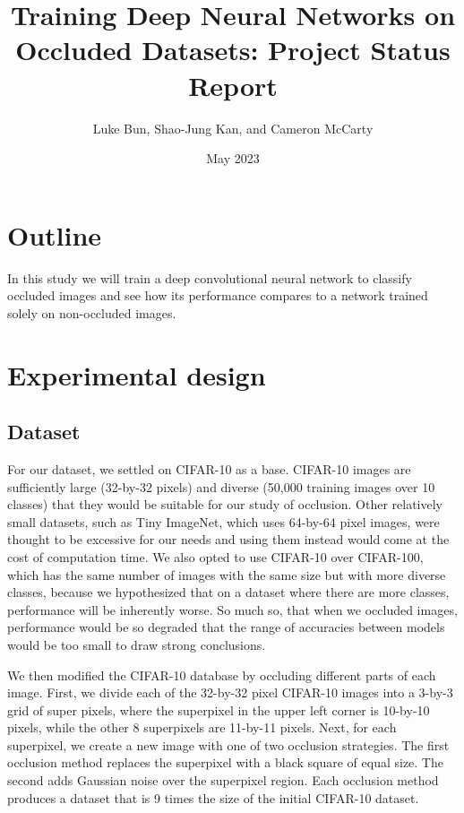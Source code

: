 \documentclass{article}
\title{Training Deep Neural Networks on Occluded Datasets: Project Status Report}
\author{Luke Bun, Shao-Jung Kan, and Cameron McCarty}
\date{May 2023}
\begin{document}
\maketitle

\section{Outline}
In this study we will train a deep convolutional neural network to classify occluded images and see how its performance compares to a network trained solely on non-occluded images. 

\section{Experimental design}
\subsection{Dataset} 
\indent For our dataset, we settled on CIFAR-10 as a base. CIFAR-10 images are sufficiently large (32-by-32 pixels) and diverse (50,000 training images over 10 classes) that they would be suitable for our study of occlusion. Other relatively small datasets, such as Tiny ImageNet, which uses 64-by-64 pixel images, were thought to be excessive for our needs and using them instead would come at the cost of computation time. We also opted to use CIFAR-10 over CIFAR-100, which has the same number of images with the same size but with more diverse classes, because we hypothesized that on a dataset where there are more classes, performance will be inherently worse. So much so, that when we occluded images, performance would be so degraded that the range of accuracies between models would be too small to draw strong conclusions.
\vspace{3mm} %

We then modified the CIFAR-10 database by occluding different parts of each image. First, we divide each of the 32-by-32 pixel CIFAR-10 images into a 3-by-3 grid of super pixels, where the superpixel in the upper left corner is 10-by-10 pixels, while the other 8 superpixels are 11-by-11 pixels. Next, for each superpixel, we create a new image with one of two occlusion strategies. The first occlusion method replaces the superpixel with a black square of equal size. The second adds Gaussian noise over the superpixel region.  Each occlusion method produces a dataset that is 9 times the size of the initial CIFAR-10 dataset. 
\vspace{3mm} %
\end{document}
